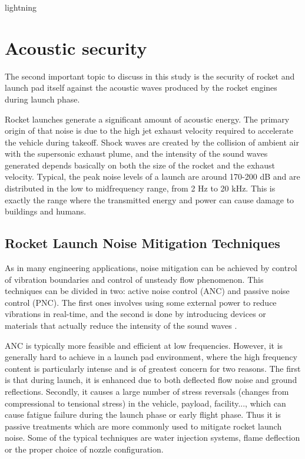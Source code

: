 lightning\section{Acoustic security}

The second important topic to discuss in this study is the security of rocket and
launch pad itself against the acoustic waves produced by the rocket engines during
launch phase.

Rocket launches generate a significant amount of acoustic energy. The primary
origin of that noise is due to the high jet exhaust velocity required to accelerate
the vehicle during takeoff. Shock waves are created by the collision of ambient air
with the supersonic exhaust plume, and the intensity of the sound waves generated
depends basically on both the size of the rocket and the exhaust
velocity. Typical, the peak noise levels of a launch are around 170-200 dB and are
distributed in the low to midfrequency range, from 2 Hz to 20 kHz. This is
exactly the range where the transmitted energy and power can cause damage to
buildings and humans\cite{2016Teitel}.

\subsection{Rocket Launch Noise Mitigation Techniques}

As in many engineering applications, noise mitigation can be achieved by control
of vibration boundaries and control of unsteady flow phenomenon. This techniques
can be divided in two: active noise control (ANC) and passive noise control (PNC).
The first ones involves using some external power to reduce vibrations in real-time,
and the second is done by introducing devices or materials that actually reduce
the intensity of the sound waves \cite{2017Lubert}.

ANC is typically more feasible and efficient at low frequencies.
However, it is generally hard to achieve in a launch pad environment, where the high frequency
content is particularly intense and is of greatest concern for two reasons. The first is that during
launch, it is enhanced due to both deflected flow noise and ground reflections. Secondly, it
causes a large number of stress reversals (changes from compressional to tensional stress)
in the vehicle, payload, facility..., which can cause fatigue failure during the launch phase
or early flight phase. Thus it is passive
treatments which are more commonly used to mitigate rocket launch noise. Some of the
typical techniques are water injection systems, flame deflection or the proper choice of nozzle configuration.

